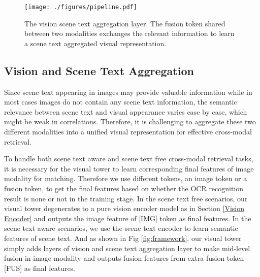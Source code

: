 \documentclass[10pt,twocolumn,letterpaper]{article}
\begin{document}
\begin{table*}
\caption{Dataset split for the evaluation of cross-modal retrieval tasks. Note that  indicates that the CTC-5K test samples have been excluded from the MSCOCO train split.}\vspace{-0.5em}
\label{Tab-setting}
\centering
{}
\end{table*}

\begin{figure}[ht]
    \centering
    \texttt{[image: ./figures/pipeline.pdf]}\vspace{-0.5em}
    \caption{The vision scene text aggregation layer. The fusion token shared between two modalities exchanges the relevant information to learn a scene text aggregated visual representation.}\vspace{-1em}
    \label{fig:pipeline}
\end{figure}


\subsection{Vision and Scene Text Aggregation} 
\label{Vision and Scene Text Aggregation}
Since scene text appearing in images may provide valuable information while in most cases images do not contain any scene text information, the semantic relevance between scene text and visual appearance varies case by case, which might be weak in correlations. Therefore, it is challenging to aggregate these two different modalities into a unified visual representation for effective cross-modal retrieval.

To handle both scene text aware and scene text free cross-modal retrieval tasks, it is necessary for the visual tower to learn corresponding final features of image modality for matching. Therefore we use different tokens, an image token or a fusion token, to get the final features based on whether the OCR recognition result is none or not in the training stage.
In the scene text free scenarios, our visual tower degenerates to a pure vision encoder model as in Section \ref{Vision Encoder} and outputs the image feature of [IMG] token as final features.
In the scene text aware scenarios, we use the scene text encoder to learn semantic features of scene text.
And as shown in Fig \ref{fig:framework}, our visual tower simply adds  layers of vision and scene text aggregation layer to make mid-level fusion in image modality and outputs fusion features from extra fusion token [FUS] as final features. 
\end{document}
